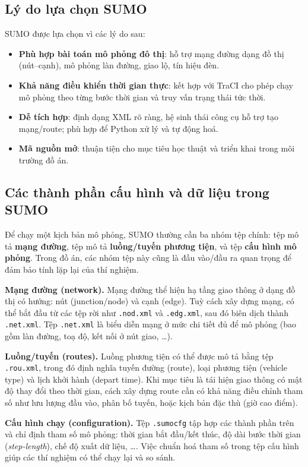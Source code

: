 \documentclass[../DoAn.tex]{subfiles}
\begin{document}
\subsection{Lý do lựa chọn SUMO}
SUMO được lựa chọn vì các lý do sau:
\begin{itemize}[leftmargin=2em]
	\item \textbf{Phù hợp bài toán mô phỏng đô thị}: hỗ trợ mạng đường dạng đồ thị (nút--cạnh), mô phỏng làn đường, giao lộ, tín hiệu đèn.
	\item \textbf{Khả năng điều khiển thời gian thực}: kết hợp với TraCI cho phép chạy mô phỏng theo từng bước thời gian và truy vấn trạng thái tức thời.
	\item \textbf{Dễ tích hợp}: định dạng XML rõ ràng, hệ sinh thái công cụ hỗ trợ tạo mạng/route; phù hợp để Python xử lý và tự động hoá.
	\item \textbf{Mã nguồn mở}: thuận tiện cho mục tiêu học thuật và triển khai trong môi trường đồ án.
\end{itemize}

\subsection{Các thành phần cấu hình và dữ liệu trong SUMO}
Để chạy một kịch bản mô phỏng, SUMO thường cần ba nhóm tệp chính: tệp mô tả \textbf{mạng đường}, tệp mô tả \textbf{luồng/tuyến phương tiện}, và tệp \textbf{cấu hình mô phỏng}. Trong đồ án, các nhóm tệp này cũng là đầu vào/đầu ra quan trọng để đảm bảo tính lặp lại của thí nghiệm.

\textbf{Mạng đường (network).} Mạng đường thể hiện hạ tầng giao thông ở dạng đồ thị có hướng: nút (junction/node) và cạnh (edge). Tuỳ cách xây dựng mạng, có thể bắt đầu từ các tệp rời như \texttt{.nod.xml} và \texttt{.edg.xml}, sau đó biên dịch thành \texttt{.net.xml}. Tệp \texttt{.net.xml} là biểu diễn mạng ở mức chi tiết đủ để mô phỏng (bao gồm làn đường, toạ độ, kết nối ở nút giao, \ldots).

\textbf{Luồng/tuyến (routes).} Luồng phương tiện có thể được mô tả bằng tệp \texttt{.rou.xml}, trong đó định nghĩa tuyến đường (route), loại phương tiện (vehicle type) và lịch khởi hành (depart time). Khi mục tiêu là tái hiện giao thông có mật độ thay đổi theo thời gian, cách xây dựng route cần có khả năng điều chỉnh tham số như lưu lượng đầu vào, phân bố tuyến, hoặc kịch bản đặc thù (giờ cao điểm).

\textbf{Cấu hình chạy (configuration).} Tệp \texttt{.sumocfg} tập hợp các thành phần trên và chỉ định tham số mô phỏng: thời gian bắt đầu/kết thúc, độ dài bước thời gian (\textit{step-length}), chế độ xuất dữ liệu, \ldots. Việc chuẩn hoá tham số trong tệp cấu hình giúp các thí nghiệm có thể chạy lại và so sánh.
\end{document}
